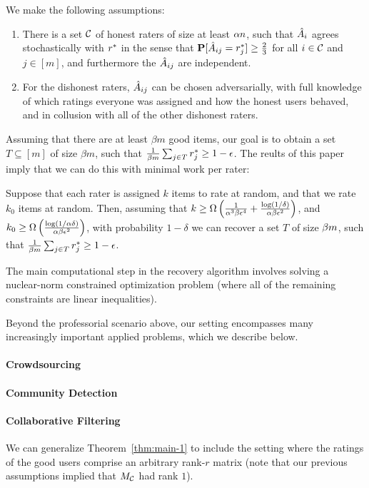We make the following assumptions:
\begin{enumerate}
\item There is a set $\mathcal{C}$ of honest raters of size at least $\alpha n$, 
      such that $\hat{A}_i$ agrees stochastically with $r^*$ in the sense that 
      $\mathbf{P}[\hat{A}_{ij} = r^*_j] \geq \frac{2}{3}$ for all $i \in \mathcal{C}$ and 
      $j \in [m]$, and furthermore the $\hat{A}_{ij}$ are independent.
\item For the dishonest raters, $\hat{A}_{ij}$ can be chosen adversarially, 
      with full knowledge of which ratings everyone was assigned and how the 
      honest users behaved, and in collusion with all of the other 
      dishonest raters.
\end{enumerate}
Assuming that there are at least $\beta m$ good items, our goal is to obtain 
a set $T \subseteq [m]$ of size $\beta m$, such that 
$\frac{1}{\beta m} \sum_{j \in T} r^*_j \geq 1-\epsilon$.
The reults of this paper imply that we can do this with minimal work per rater:
\begin{theorem}
\label{thm:main-1}
Suppose that each rater is assigned $k$ items to rate at random, and that we rate 
$k_0$ items at random. Then, assuming that $k \geq \Omega\left( \frac{1}{\alpha^3\beta\epsilon^4} + \frac{\log(1/\delta)}{\alpha\beta\epsilon^2} \right)$, and 
$k_0 \geq \Omega\left( \frac{\log(1/\alpha\delta)}{\alpha\beta\epsilon^2} \right)$, 
with probability $1-\delta$ we can recover a set $T$ of size $\beta m$, 
such that $\frac{1}{\beta m} \sum_{j \in T} r^*_j \geq 1-\epsilon$.
\end{theorem}
The main computational step in the recovery algorithm involves solving a 
nuclear-norm constrained optimization problem (where all of the remaining 
constraints are linear inequalities).

Beyond the professorial scenario above, our setting encompasses many increasingly 
important applied problems, which we describe below.

\paragraph{Crowdsourcing}

\paragraph{Community Detection}

\paragraph{Collaborative Filtering}
We can generalize Theorem~\ref{thm:main-1} to include the setting 
where the ratings of the good users comprise an arbitrary rank-$r$ matrix (note 
that our previous assumptions implied that $M_{\mathcal{C}}$ had rank $1$).

